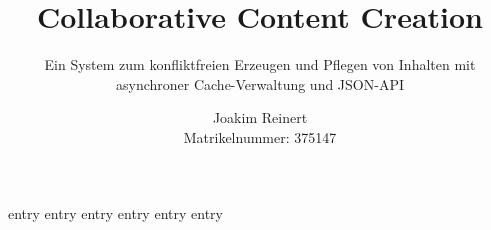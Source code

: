 \documentclass[a4paper,twoside,parskip=half,toc=bibliography]{scrbook}
\title{Collaborative Content Creation}
\subtitle{%
	Ein System zum konfliktfreien Erzeugen und Pflegen von Inhalten
	mit asynchroner Cache-Verwaltung und JSON-API%
}
\author{%
	Joakim Reinert\\%
	{\small Matrikelnummer: 375147}%
}
\date{\revisiondate}
\begin{document}
	\maketitle
	\tableofcontents

	{entry}
	{entry}
	{entry}
	{entry}
	{entry}
	{entry}
\end{document}
